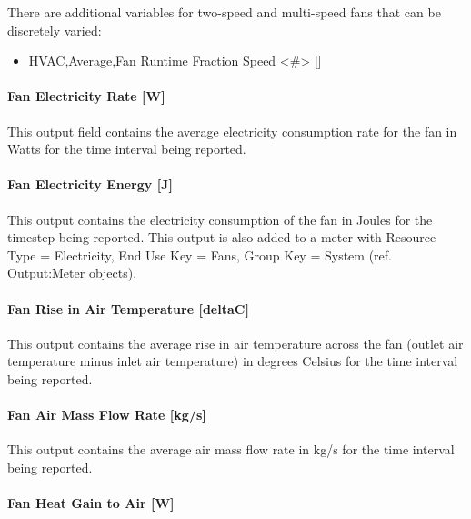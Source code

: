There are additional variables for two-speed and multi-speed fans that can be discretely varied:

\begin{itemize}
\item
  HVAC,Average,Fan Runtime Fraction Speed <\#> {[]}
\end{itemize}

\paragraph{Fan Electricity Rate {[}W{]}}\label{fan-electric-power-fansysmodel}

This output field contains the average electricity consumption rate for the fan in Watts for the time interval being reported.

\paragraph{Fan Electricity Energy {[}J{]}}\label{fan-electric-energy-fansysmodel}

This output contains the electricity consumption of the fan in Joules for the timestep being reported. This output is also added to a meter with Resource Type = Electricity, End Use Key = Fans, Group Key = System (ref. Output:Meter objects).

\paragraph{Fan Rise in Air Temperature {[}deltaC{]}}\label{fan-rise-in-air-temperature-deltac-fansysmodel}

This output contains the average rise in air temperature across the fan (outlet air temperature minus inlet air temperature) in degrees Celsius for the time interval being reported.

\paragraph{Fan Air Mass Flow Rate {[}kg/s{]}}\label{fan-air-mass-flow-fansysmodel}

This output contains the average air mass flow rate in kg/s for the time interval being reported.

\paragraph{Fan Heat Gain to Air {[}W{]}}\label{fan-heat-gain-to-air-fansysmodel}

